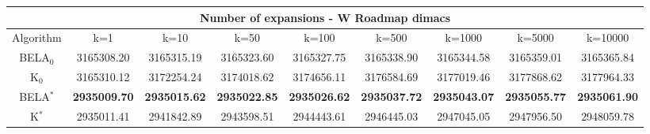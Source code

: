 \begin{tabular}{c|cccccccc}\toprule
\multicolumn{9}{c}{Number of expansions - W Roadmap dimacs}\\ \midrule
Algorithm & k=1 & k=10 & k=50 & k=100 & k=500 & k=1000 & k=5000 & k=10000 \\ \midrule
BELA$_0$ & 3165308.20 & 3165315.19 & 3165323.60 & 3165327.75 & 3165338.90 & 3165344.58 & 3165359.01 & 3165365.84 \\
K$_0$ & 3165310.12 & 3172254.24 & 3174018.62 & 3174656.11 & 3176584.69 & 3177019.46 & 3177868.62 & 3177964.33 \\
BELA$^*$ & \textbf{2935009.70} & \textbf{2935015.62} & \textbf{2935022.85} & \textbf{2935026.62} & \textbf{2935037.72} & \textbf{2935043.07} & \textbf{2935055.77} & \textbf{2935061.90} \\
K$^*$ & 2935011.41 & 2941842.89 & 2943598.51 & 2944443.61 & 2946445.03 & 2947045.05 & 2947956.50 & 2948059.78 \\ \bottomrule 
\end{tabular}

